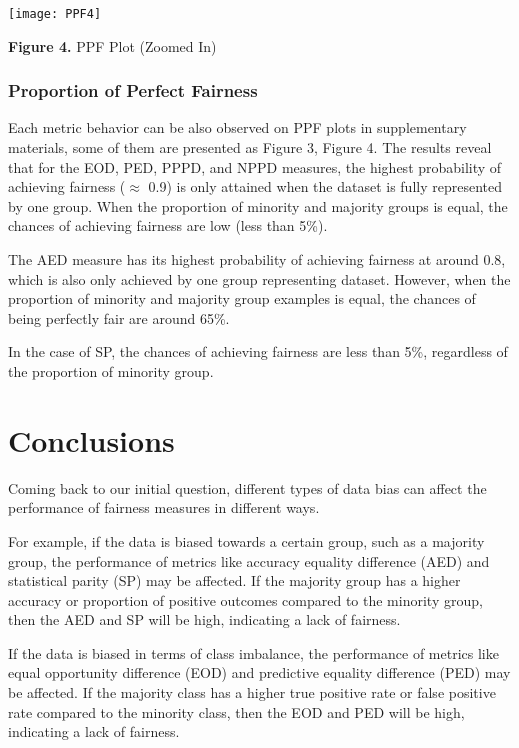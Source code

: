 \documentclass[a4paper, 12pt]{article}
\begin{document}
\begin{flushleft}
\texttt{[image: PPF4]}
\end{flushleft}

\begin{center}

\bigbreak
\normalsize{\textbf{Figure 4.} PPF Plot (Zoomed In)}
\end{center}

\subsubsection{Proportion of Perfect Fairness}

Each metric behavior can be also observed on PPF plots in supplementary materials, some of them are presented as Figure 3, Figure 4. The results reveal that for the EOD, PED, PPPD, and NPPD measures, the highest probability of achieving fairness ($\approx$ 0.9) is only attained when the dataset is fully represented by one group. When the proportion of minority and majority groups is equal, the chances of achieving fairness are low (less than 5\%).

The AED measure has its highest probability of achieving fairness at around 0.8, which is also only achieved by one group representing dataset. However, when the proportion of minority and majority group examples is equal, the chances of being perfectly fair are around 65\%.

In the case of SP, the chances of achieving fairness are less than 5\%, regardless of the proportion of minority group.



\clearpage

\section{Conclusions}

Coming back to our initial question, different types of data bias can affect the performance of fairness measures in different ways.

For example, if the data is biased towards a certain group, such as a majority group, the performance of metrics like accuracy equality difference (AED) and statistical parity (SP) may be affected. If the majority group has a higher accuracy or proportion of positive outcomes compared to the minority group, then the AED and SP will be high, indicating a lack of fairness.

If the data is biased in terms of class imbalance, the performance of metrics like equal opportunity difference (EOD) and predictive equality difference (PED) may be affected. If the majority class has a higher true positive rate or false positive rate compared to the minority class, then the EOD and PED will be high, indicating a lack of fairness.
\end{document}
